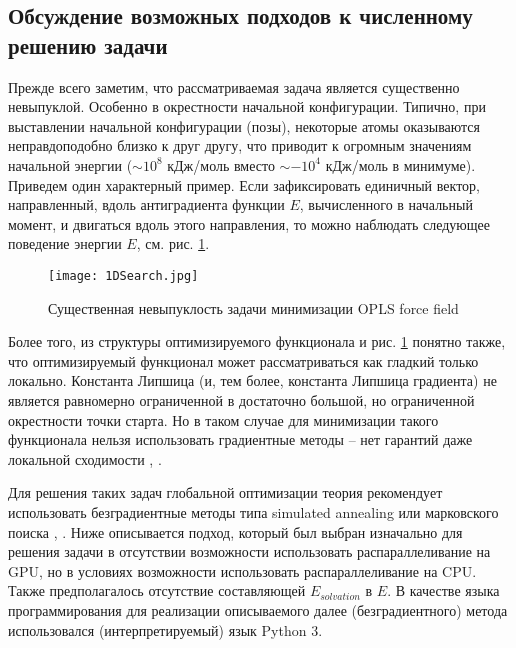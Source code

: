   \subsection{Обсуждение возможных подходов к численному решению задачи}\label{subsec:sec1/su3}

  Прежде всего заметим, что рассматриваемая задача является существенно невыпуклой. Особенно в окрестности начальной конфигурации. Типично, при выставлении начальной конфигурации (позы), некоторые атомы оказываются неправдоподобно близко к друг другу, что приводит к огромным значениям начальной энергии ($\sim 10^{8}$ кДж/моль вместо $\sim -10^4$ кДж/моль в минимуме). Приведем один характерный пример. Если зафиксировать единичный вектор, направленный, вдоль антиградиента функции $E$, вычисленного в начальный момент, и двигаться вдоль этого направления, то можно наблюдать следующее поведение энергии $E$, см. рис. \ref{fig1D}.

  \begin{figure}
  \begin{center}
  \texttt{[image: 1DSearch.jpg]}
  \end{center}
   \caption{Существенная невыпуклость задачи минимизации OPLS force field}
    \label{fig1D}
   \end{figure}
   
  Более того, из структуры оптимизируемого функционала и рис. \ref{fig1D} понятно также, что оптимизируемый функционал может рассматриваться как гладкий только локально. Константа Липшица (и, тем более, константа Липшица градиента) не является равномерно ограниченной в достаточно большой, но ограниченной окрестности точки старта. Но в таком случае для минимизации такого функционала нельзя использовать градиентные методы -- нет гарантий даже локальной сходимости \cite{ghadimi2015generalized}, \cite{nesterov2017random}. 
   
  Для решения таких задач глобальной оптимизации теория рекомендует использовать безградиентные методы типа simulated annealing или марковского поиска \cite{zhigljavsky2007stochastic}, \cite{zhigljavsky2012theory}. Ниже описывается подход, который был выбран изначально для решения задачи в отсутствии возможности использовать распараллеливание на GPU, но в условиях возможности использовать распараллеливание на CPU. Также предполагалось отсутствие составляющей  $E_{solvation}$ в $E$. В качестве языка программирования для реализации описываемого далее (безградиентного) метода использовался (интерпретируемый) язык Python 3.
   
